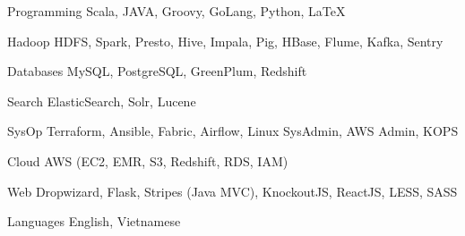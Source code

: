 

\begin{cvskills}

  \cvskill
    {Programming} %
    {Scala, JAVA, Groovy, GoLang, Python, LaTeX} %

  \cvskill
    {Hadoop} %
    {HDFS, Spark, Presto, Hive, Impala, Pig, HBase, Flume, Kafka, Sentry} %

  \cvskill
    {Databases} %
    {MySQL, PostgreSQL, GreenPlum, Redshift} %

  \cvskill
    {Search} %
    {ElasticSearch, Solr, Lucene} %

  \cvskill
    {SysOp} %
    {Terraform, Ansible, Fabric, Airflow, Linux SysAdmin, AWS Admin, KOPS} %

  \cvskill
    {Cloud} %
    {AWS (EC2, EMR, S3, Redshift, RDS, IAM)} %

  \cvskill
    {Web} %
    {Dropwizard, Flask, Stripes (Java MVC), KnockoutJS, ReactJS, LESS, SASS} %

  \cvskill
    {Languages} %
    {English, Vietnamese} %

\end{cvskills}
